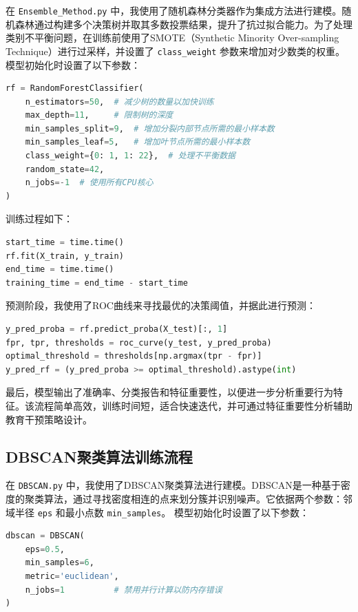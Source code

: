 \documentclass{SYSUReport}
\begin{document}
在 \texttt{Ensemble_Method.py} 中，我使用了随机森林分类器作为集成方法进行建模。随机森林通过构建多个决策树并取其多数投票结果，提升了抗过拟合能力。为了处理类别不平衡问题，在训练前使用了SMOTE（Synthetic Minority Over-sampling Technique）进行过采样，并设置了 \texttt{class_weight} 参数来增加对少数类的权重。
模型初始化时设置了以下参数：

\begin{lstlisting}[language=Python]
rf = RandomForestClassifier(
    n_estimators=50,  # 减少树的数量以加快训练
    max_depth=11,     # 限制树的深度
    min_samples_split=9,  # 增加分裂内部节点所需的最小样本数
    min_samples_leaf=5,   # 增加叶节点所需的最小样本数
    class_weight={0: 1, 1: 22},  # 处理不平衡数据
    random_state=42,
    n_jobs=-1  # 使用所有CPU核心
)
\end{lstlisting}

训练过程如下：

\begin{lstlisting}[language=Python]
start_time = time.time()
rf.fit(X_train, y_train)
end_time = time.time()
training_time = end_time - start_time
\end{lstlisting}

预测阶段，我使用了ROC曲线来寻找最优的决策阈值，并据此进行预测：

\begin{lstlisting}[language=Python]
y_pred_proba = rf.predict_proba(X_test)[:, 1]
fpr, tpr, thresholds = roc_curve(y_test, y_pred_proba)
optimal_threshold = thresholds[np.argmax(tpr - fpr)]
y_pred_rf = (y_pred_proba >= optimal_threshold).astype(int)
\end{lstlisting}

最后，模型输出了准确率、分类报告和特征重要性，以便进一步分析重要行为特征。该流程简单高效，训练时间短，适合快速迭代，并可通过特征重要性分析辅助教育干预策略设计。



\subsection{DBSCAN聚类算法训练流程}

在 \texttt{DBSCAN.py} 中，我使用了DBSCAN聚类算法进行建模。DBSCAN是一种基于密度的聚类算法，通过寻找密度相连的点来划分簇并识别噪声。它依据两个参数：邻域半径 \texttt{eps} 和最小点数 \texttt{min_samples}。
模型初始化时设置了以下参数：

\begin{lstlisting}[language=Python]
dbscan = DBSCAN(
    eps=0.5,          
    min_samples=6,    
    metric='euclidean',
    n_jobs=1          # 禁用并行计算以防内存错误
)
\end{lstlisting}
\end{document}
